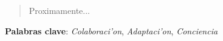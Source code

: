 \newpage\thispagestyle{plain}
\label{Resumen}
\begin{center}
\vspace*{5mm}{\Large \TITULO} \\

\vspace{4mm}{\large \sergio} \\

\vspace{8mm}{\Large RESUMEN}
\end{center}

\vspace{2mm}
\begin{quote}
Proximamente...
\end{quote}
\vspace{4mm}
\noindent 
\textbf{Palabras clave}: 
\emph{Colaboraci'on}, \emph{Adaptaci'on}, \emph{Conciencia}